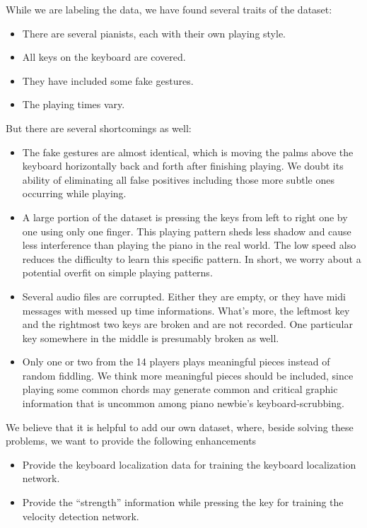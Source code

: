 \documentclass[10pt,twocolumn,letterpaper]{article}
\begin{document}
While we are labeling the data, we have found several traits of the dataset:
\begin{itemize}
  \item There are several pianists, each with their own playing style.
  \item All keys on the keyboard are covered.
  \item They have included some fake gestures.
  \item The playing times vary.
\end{itemize}

But there are several shortcomings as well:
\begin{itemize}
  \item The fake gestures are almost identical, which is moving the palms above the keyboard horizontally back and forth after finishing playing. We doubt its ability of eliminating all false positives including those more subtle ones occurring while playing.
  \item A large portion of the dataset is pressing the keys from left to right one by one using only one finger. This playing pattern sheds less shadow and cause less interference than playing the piano in the real world. The low speed also reduces the difficulty to learn this specific pattern. In short, we worry about a potential overfit on simple playing patterns.
  \item Several audio files are corrupted. Either they are empty, or they have midi messages with messed up time informations. What’s more, the leftmost key and the rightmost two keys are broken and are not recorded. One particular key somewhere in the middle is presumably broken as well.
  \item Only one or two from the 14 players plays meaningful pieces instead of random fiddling. We think more meaningful pieces should be included, since playing some common chords may generate common and critical graphic information that is uncommon among piano newbie’s keyboard-scrubbing.
\end{itemize}

We believe that it is helpful to add our own dataset, where, beside solving these problems, we want to provide the following enhancements
\begin{itemize}
  \item Provide the keyboard localization data for training the keyboard localization network.
  \item Provide the ``strength'' information while pressing the key for training the velocity detection network.
\end{itemize}
\end{document}
